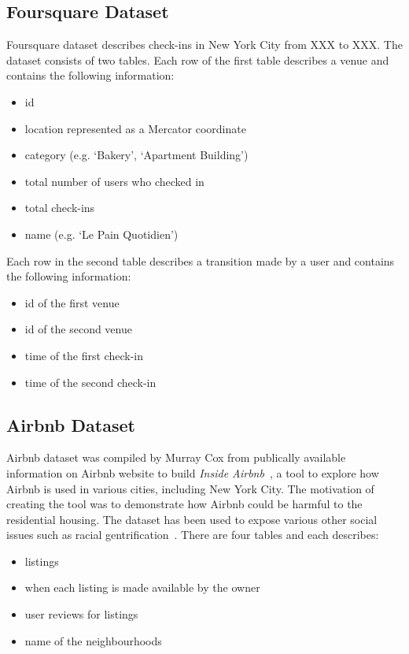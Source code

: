 \subsection{Foursquare Dataset}
Foursquare dataset describes check-ins in New York City from \color{red} XXX to XXX.\color{black} 
The dataset consists of two tables.
Each row of the first table describes a venue and contains the following information:
\begin{itemize}
\item id
\item location represented as a Mercator coordinate
\item category (e.g. `Bakery', `Apartment Building')
\item total number of users who checked in
\item total check-ins
\item name (e.g. `Le Pain Quotidien')
\end{itemize}
Each row in the second table describes a transition made by a user and contains the following information:
\begin{itemize}
\item id of the first venue 
\item id of the second venue
\item time of the first check-in
\item time of the second check-in
\end{itemize}
\subsection{Airbnb Dataset}
Airbnb dataset was compiled by Murray Cox from publically available information on Airbnb website to build \emph{Inside Airbnb}~\citep{insideairbnb}, a tool to explore how Airbnb is used in various cities, including New York City.
The motivation of creating the tool was to demonstrate how Airbnb could be harmful to the residential housing.
The dataset has been used to expose various other social issues such as racial gentrification~\citep{gentrification}.
There are four tables and each describes:
\begin{itemize}
\item listings
\item when each listing is made available by the owner
\item user reviews for listings
\item name of the neighbourhoods
\end{itemize}